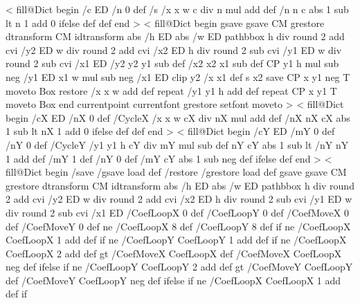 \ifx\PstTiling\@undefined
  <%
    fill@Dict begin
    /c ED
    /n 0 def
    /s {
      /x x w c div n mul add def
      /n n c abs 1 sub lt { n 1 add } { 0 } ifelse def
    } def
    end
  >
<%
  fill@Dict begin
  gsave
    gsave \tx@STV CM grestore dtransform CM idtransform
    abs /h ED abs /w ED
    pathbbox
    h div round 2 add cvi /y2 ED
    w div round 2 add cvi /x2 ED
    h div round 2 sub cvi /y1 ED
    w div round 2 sub cvi /x1 ED
    /y2 y2 y1 sub def
    /x2 x2 x1 sub def
    CP
    y1 h mul sub neg /y1 ED
    x1 w mul sub neg /x1 ED
    clip
    y2 {
      /x x1 def
      s
      x2 {
        save CP x y1
        \ifx\VTeXversion\undefined
        \else
        neg
        \fi
        T moveto Box restore
        /x x w add def
      } repeat
      /y1 y1 h add def
    } repeat
    CP x y1 T moveto Box
    end
  currentpoint currentfont grestore setfont moveto
  >
\else%
  <
    fill@Dict begin
    /cX ED
    /nX 0 def
    /CycleX {
      /x x w cX div nX mul add def
      /nX nX cX abs 1 sub lt { nX 1 add } { 0 } ifelse def
    } def 
    end
  >
  <%
    fill@Dict begin
    /cY ED
    /mY 0 def
    /nY 0 def
    /CycleY {
      /y1 y1 h cY div mY mul sub def
      nY cY abs 1 sub lt { /nY nY 1 add def /mY 1 def }
                       { /nY 0 def        /mY cY abs 1 sub neg def } ifelse
    } def
    end
  >
  <
    \ifPSTlualatex
      fill@Dict begin
      /save /gsave load def
      /restore /grestore load def
    \fi
    gsave
    gsave \tx@STV CM grestore dtransform CM idtransform
    abs /h ED abs /w ED
    pathbbox 
    h div round 2 add cvi /y2 ED
    w div round 2 add cvi /x2 ED
    h div round 2 sub cvi /y1 ED
    w div round 2 sub cvi /x1 ED
    /CoefLoopX 0 def
    /CoefLoopY 0 def
    /CoefMoveX 0 def
    /CoefMoveY 0 def
    \psk@boxfillangle{} ne {/CoefLoopX 8 def /CoefLoopY 8 def} if
    \psk@fillcyclex{} ne {/CoefLoopX CoefLoopX 1 add def} if
    \psk@fillcycley{} ne {/CoefLoopY CoefLoopY 1 add def} if
    \psk@fillmovex{} ne
      {/CoefLoopX CoefLoopX 2 add def
       \psk@fillmovex{} gt {/CoefMoveX CoefLoopX def}
                           {/CoefMoveX CoefLoopX neg def} ifelse} if
    \psk@fillmovey{} ne
      {/CoefLoopY CoefLoopY 2 add def
       \psk@fillmovey{} gt {/CoefMoveY CoefLoopY def}
                           {/CoefMoveY CoefLoopY neg def} ifelse} if
    \psk@fillsepx{} ne {/CoefLoopX CoefLoopX 1 add def} if

